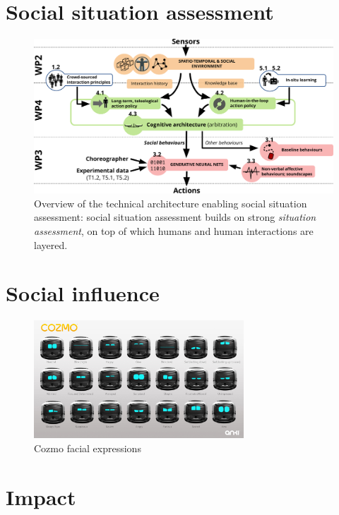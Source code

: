 \documentclass[11pt,a4paper]{report}
\begin{document}
\section{Social situation assessment}

\begin{figure}
\centering
\includegraphics[width=0.9\linewidth]{figs/archi}
\caption{Overview of the technical architecture enabling social situation
    assessment: social situation assessment builds on strong \emph{situation
    assessment}, on top of which humans and human interactions are layered.}
\label{fig:social-situation-assessment}
\end{figure}



\section{Social influence}

\begin{figure}[!htbp]
\centering
    \includegraphics[width=0.7\textwidth]{figs/cozmo-expression-sheet.jpg}
\caption{Cozmo facial expressions}
\end{figure}


\section{Impact}\label{impact}
\end{document}
